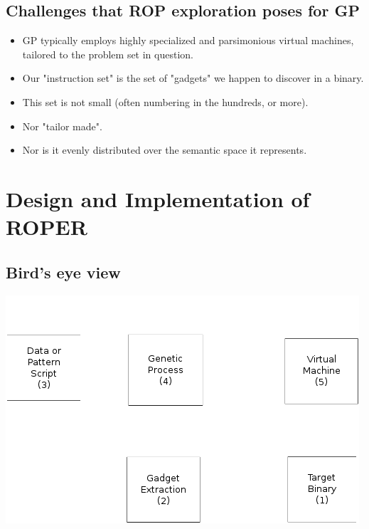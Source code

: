 \documentclass[11pt]{article}
\begin{document}
\subsection*{Challenges that ROP exploration poses for GP}
\label{sec:orgce7f464}

\begin{itemize}
\item GP typically employs highly specialized and parsimonious virtual machines,
tailored to the problem set in question.
\item Our "instruction set" is the set of "gadgets" we happen to discover in a binary.
\item This set is not small (often numbering in the hundreds, or more).
\item Nor "tailor made".
\item Nor is it evenly distributed over the semantic space it represents.
\end{itemize}


\section*{Design and Implementation of ROPER}
\label{sec:orgfa9285c}

\subsection*{Bird's eye view}
\label{sec:orgf630d43}
\begin{center}
\includegraphics[width=.9\linewidth]{./img/birdseye_white.png}
\end{center}
\end{document}
